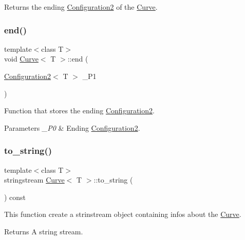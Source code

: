 Returns the ending {\ttfamily \mbox{\hyperlink{class_configuration2}{Configuration2}}} of the {\ttfamily \mbox{\hyperlink{class_curve}{Curve}}}. 

\mbox{\label{class_curve_a5b11ffc442dcdca2def5d09ad4fbb424}} 
\subsubsection{\texorpdfstring{end()}{end()}\hspace{0.1cm}{\footnotesize\ttfamily [2/2]}}
{\footnotesize\ttfamily template$<$class T$>$ \\
void \mbox{\hyperlink{class_curve}{Curve}}$<$ T $>$\+::end (\begin{DoxyParamCaption}\item[{\mbox{\hyperlink{class_configuration2}{Configuration2}}$<$ T $>$}]{\+\_\+\+P1 }\end{DoxyParamCaption})\hspace{0.3cm}{\ttfamily [inline]}}

Function that stores the ending {\ttfamily \mbox{\hyperlink{class_configuration2}{Configuration2}}}. 
\begin{DoxyParams}{Parameters}
{\em \+\_\+\+P0} & Ending {\ttfamily \mbox{\hyperlink{class_configuration2}{Configuration2}}}. \\
\hline
\end{DoxyParams}
\mbox{\label{class_curve_a92e5b3a7445040e0e1e8a96707c5e6c2}} 
\subsubsection{\texorpdfstring{to\_string()}{to\_string()}}
{\footnotesize\ttfamily template$<$class T$>$ \\
stringstream \mbox{\hyperlink{class_curve}{Curve}}$<$ T $>$\+::to\+\_\+string (\begin{DoxyParamCaption}{ }\end{DoxyParamCaption}) const\hspace{0.3cm}{\ttfamily [inline]}}

This function create a strinstream object containing infos about the {\ttfamily \mbox{\hyperlink{class_curve}{Curve}}}. \begin{DoxyReturn}{Returns}
A string stream. 
\end{DoxyReturn}


